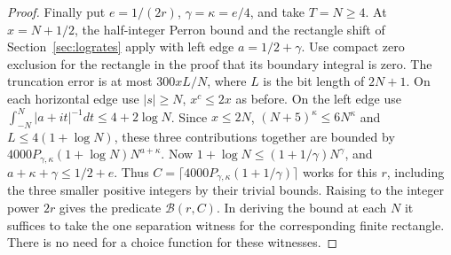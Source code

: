 \begin{proof}
Finally put $e=1/(2r)$, $\gamma=\kappa=e/4$, and take $T=N\ge4$.
At $x=N+1/2$, the half-integer Perron bound and the rectangle shift
of Section~\ref{sec:logrates} apply with left edge
$a=1/2+\gamma$. Use compact zero exclusion for the rectangle in
the proof that its boundary integral is zero. The truncation error
is at most $300xL/N$, where $L$ is the bit length of $2N+1$.
On each horizontal edge use $|s|\ge N$, $x^c\le2x$ as before.
On the left edge use $\int_{-N}^{N}|a+it|^{-1}dt\le4+2\log N$.
Since $x\le2N$, $(N+5)^\kappa\le6N^\kappa$ and
$L\le4(1+\log N)$, these three contributions together are bounded by
$4000 P_{\gamma,\kappa} (1+\log N)N^{a+\kappa}$.
Now $1+\log N\le(1+1/\gamma)N^\gamma$, and
$a+\kappa+\gamma\le1/2+e$. Thus
$C=\lceil4000 P_{\gamma,\kappa}(1+1/\gamma)\rceil$ works for
this $r$, including the three smaller positive integers by their
trivial bounds. Raising to the integer power $2r$ gives the
predicate $\mathcal B(r,C)$. In deriving the bound at each $N$ it
suffices to take the one separation witness for the corresponding
finite rectangle. There is no need for a choice function for these
witnesses.
\end{proof}
